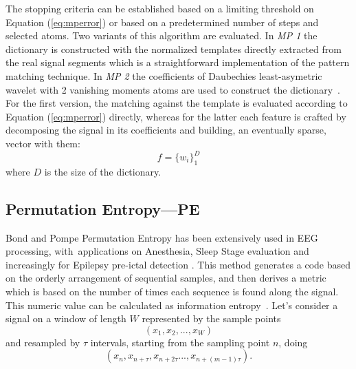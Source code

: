 \documentclass[brainsci,article,accept,moreauthors,pdftex,10pt,a4paper]{mdpi}
\begin{document}
The stopping criteria can be established based on a limiting threshold on Equation (\ref{eq:mperror}) or based on a predetermined number of steps and selected atoms.  Two variants of this algorithm are evaluated. In \textit{MP 1} the dictionary is constructed with the normalized templates directly extracted from the real signal segments which is a straightforward implementation of the pattern matching technique.  In \textit{MP 2} the coefficients of Daubechies least-asymetric wavelet with 2 vanishing moments atoms are used to construct the dictionary~\citep{Vareka2012}.  For the first version, the matching against the template is evaluated according to Equation (\ref{eq:mperror}) directly, whereas for the latter each feature is crafted by decomposing the signal in its coefficients and building, an eventually sparse, vector with them:
\begin{equation}
f =  {\bigg \{ w_{i} \bigg \}}_{1}^{D} 
\label{eq:mp6}
\end{equation}
where $D$ is the size of the dictionary.  



\subsection{Permutation Entropy---PE}

Bond and Pompe Permutation Entropy has been extensively used in EEG processing, with~applications on Anesthesia, Sleep Stage evaluation and increasingly for Epilepsy pre-ictal detection \citep{Bandt2002}.  This method generates a code based on the orderly arrangement of sequential samples, and then derives a metric which is based on the number of times each sequence is found along the signal.  This numeric value can be calculated as information entropy~\citep{Nicolaou2010}. Let's consider a signal on a window of length $W$ represented by the sample points
\begin{equation}
(x_1,x_2,...,x_{W})
\label{eq:pesignal}
\end{equation}
and resampled by $\tau$ intervals, starting from the sampling point $n$, doing
\begin{equation}
(x_n,x_{n+\tau},x_{n+2 \tau}...,x_{n+(m-1)\tau}).
\label{eq:pe2}
\end{equation}
\end{document}
